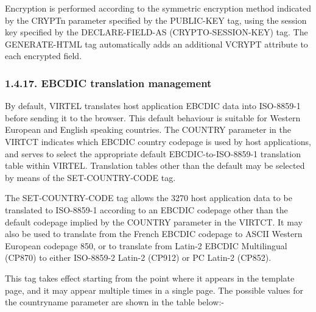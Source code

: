 \documentclass[letterpaper,10pt,english]{sphinxmanual}
\begin{document}
Encryption is performed according to the symmetric encryption method indicated by the CRYPTn parameter specified by the PUBLIC-KEY tag, using the session key specified by the DECLARE-FIELD-AS (CRYPTO-SESSION-KEY) tag. The GENERATE-HTML tag automatically adds an additional VCRYPT attribute to each encrypted field.


\subsubsection{1.4.17. EBCDIC translation management}
\label{\detokenize{User_Guide:ebcdic-translation-management}}\label{\detokenize{User_Guide:v457ug-ebcdic-translation}}

By default, VIRTEL translates host application EBCDIC data into ISO-8859-1 before sending it to the browser. This default behaviour is suitable for Western European and English speaking countries. The COUNTRY parameter in the VIRTCT indicates which EBCDIC country codepage is used by host applications, and serves to select the appropriate default EBCDIC-to-ISO-8859-1 translation table within VIRTEL. Translation tables other than the default may be selected by means of the SET-COUNTRY-CODE tag.
\label{\detokenize{User_Guide:v457ug-set-country-code}}

\begin{sphinxVerbatim}[commandchars=\\\{\}]
 
\end{sphinxVerbatim}

The SET-COUNTRY-CODE tag allows the 3270 host application data to be translated to ISO-8859-1 according to an EBCDIC codepage other than the default codepage implied by the COUNTRY parameter in the VIRTCT. It may also be used to translate from the French EBCDIC codepage to ASCII Western European codepage 850, or to translate from Latin-2 EBCDIC Multilingual (CP870) to either ISO-8859-2 Latin-2 (CP912) or PC Latin-2 (CP852).

This tag takes effect starting from the point where it appears in the template page, and it may appear multiple times in
a single page. The possible values for the countryname parameter are shown in the table below:-
\end{document}
